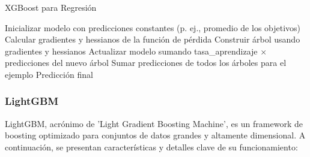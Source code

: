 \documentclass[12pt]{article}
\begin{document}
\begin{algorithm}
\caption{XGBoost para Regresión}
\begin{algorithmic}
    \State Inicializar modelo con predicciones constantes (p. ej., promedio de los objetivos)
        \State Calcular gradientes y hessianos de la función de pérdida
        \State Construir árbol usando gradientes y hessianos
        \State Actualizar modelo sumando tasa\_aprendizaje $\times$ predicciones del nuevo árbol
    \EndFor
        \State Sumar predicciones de todos los árboles para el ejemplo 
        \State \Return Predicción final
    \EndProcedure
\EndProcedure
\end{algorithmic}
\end{algorithm}




\subsubsection{LightGBM}

LightGBM, acrónimo de 'Light Gradient Boosting Machine', es un framework de boosting optimizado para conjuntos de datos grandes y altamente dimensional. A continuación, se presentan características y detalles clave de su funcionamiento:
\end{document}
